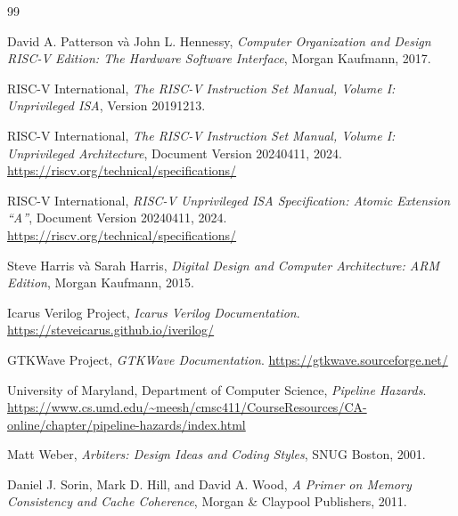 \begin{thebibliography}{99}

David A. Patterson và John L. Hennessy,
\emph{Computer Organization and Design RISC-V Edition: The Hardware Software Interface},
Morgan Kaufmann, 2017.

RISC-V International,
\emph{The RISC-V Instruction Set Manual, Volume I: Unprivileged ISA},
Version 20191213.

RISC-V International,
\emph{The RISC-V Instruction Set Manual, Volume I: Unprivileged Architecture},
Document Version 20240411, 2024.
\url{https://riscv.org/technical/specifications/}

RISC-V International,
\emph{RISC-V Unprivileged ISA Specification: Atomic Extension ``A''},
Document Version 20240411, 2024.
\url{https://riscv.org/technical/specifications/}

Steve Harris và Sarah Harris,
\emph{Digital Design and Computer Architecture: ARM Edition},
Morgan Kaufmann, 2015.

Icarus Verilog Project,
\emph{Icarus Verilog Documentation}.
\url{https://steveicarus.github.io/iverilog/}

GTKWave Project,
\emph{GTKWave Documentation}.
\url{https://gtkwave.sourceforge.net/}

University of Maryland, Department of Computer Science,
\emph{Pipeline Hazards}.
\url{https://www.cs.umd.edu/~meesh/cmsc411/CourseResources/CA-online/chapter/pipeline-hazards/index.html}

Matt Weber,
\emph{Arbiters: Design Ideas and Coding Styles},
SNUG Boston, 2001.

Daniel J. Sorin, Mark D. Hill, and David A. Wood,
\emph{A Primer on Memory Consistency and Cache Coherence},
Morgan \& Claypool Publishers, 2011.

\end{thebibliography}
